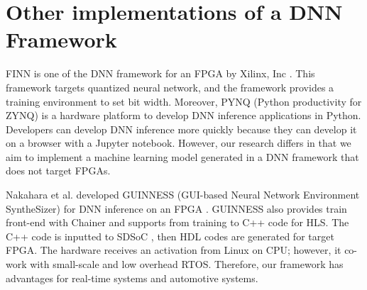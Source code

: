 \section{Other implementations of a DNN Framework}
FINN is one of the DNN framework for an FPGA by Xilinx, Inc \cite{umuroglu2017finn,blott2018finn}.
This framework targets quantized neural network, and the framework provides a training environment to set bit width.
Moreover, PYNQ (Python productivity for ZYNQ)\cite{pynq} is a hardware platform to develop DNN inference applications in Python.
Developers can develop DNN inference more quickly because they can develop it on a browser with a Jupyter notebook.
However, our research differs in that we aim to implement a machine learning model generated in a DNN framework that does not target FPGAs.


Nakahara et al. developed GUINNESS (GUI-based Neural Network Environment SyntheSizer) for DNN inference on an FPGA \cite{nakahara2017fully,yonekawa2017chip}.
GUINNESS also provides train front-end with Chainer and supports from training to C++ code for HLS.
The C++ code is inputted to SDSoC \cite{sdsoc}, then HDL codes are generated for target FPGA.
The hardware receives an activation from Linux on CPU; however, it co-work with small-scale and low overhead RTOS.
Therefore, our framework has advantages for real-time systems and automotive systems.
